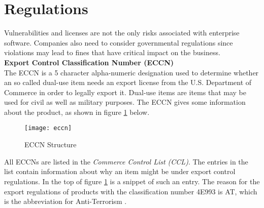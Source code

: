 \section{Regulations}
Vulnerabilities and licenses are not the only risks associated with enterprise software. Companies also need to consider governmental regulations since violations may lead to fines that have critical impact on the business.\\

\noindent
\textbf{Export Control Classification Number (ECCN)}\\
\noindent
The ECCN is a 5 character alpha-numeric designation used to determine whether an so called dual-use item needs an export license from the U.S. Department of Commerce in order to legally export it. Dual-use items are items that may be used for civil as well as military purposes. The ECCN gives some information about the product, as shown in figure \ref{fig:ECCN Structure} below.

\begin{figure}[H]
	\centering
	\texttt{[image: eccn]}
	\caption[ECCN Structure]{ECCN Structure }
	\label{fig:ECCN Structure}
\end{figure}

All ECCNs are listed in the \textit{Commerce Control List (CCL)}. The entries in the list contain information about why an item might be under export control regulations. In the top of figure \ref{fig:ECCN Structure} is a snippet of such an entry. The reason for the export regulations of products with the classification number 4E993 is AT, which is the abbreviation for Anti-Terrorism \cite{ECCN}.